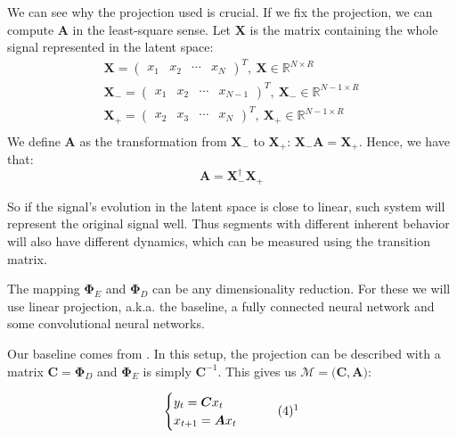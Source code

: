 \documentclass[twocolumn,10pt]{asme2ej}
\begin{document}
We can see why the projection used is crucial. If we fix the projection, we can compute $\bm A$ in the least-square sense. Let $\bm X$ is the matrix containing the whole signal represented in the latent space:
\begin{equation*}
    \label{eq:notation+-}
    \begin{gathered}
        \bm X = \begin{pmatrix}x_1 & x_2 & \cdots & x_{N}\end{pmatrix}^T,\ \bm X \in \mathbb{R}^{N \times R}\\
        \bm X_- = \begin{pmatrix}x_1 & x_2 & \cdots & x_{N-1}\end{pmatrix}^T,\ \bm X_- \in \mathbb{R}^{N-1 \times R}\\
        \bm X_+ = \begin{pmatrix}x_2 & x_3 & \cdots & x_{N}\end{pmatrix}^T,\ \bm X_+ \in \mathbb{R}^{N-1 \times R}\\
    \end{gathered}
\end{equation*}
We define $\bm A$ as the transformation from $\bm X_-$ to $\bm X_+$: $\bm X_- \bm A = \bm X_+$. Hence, we have that:
\begin{equation}
    \label{eq:A}
    \bm A = \bm X_-^\dagger \bm X_+
\end{equation}

So if the signal's evolution in the latent space is close to linear, such system will represent the original signal well. Thus segments with different inherent behavior will also have different dynamics, which can be measured using the transition matrix.

The mapping $\bm \Phi_E$ and $\bm \Phi_D$ can be any dimensionality reduction. For these we will use linear projection, a.k.a. the baseline, a fully connected neural network and some convolutional neural networks.

Our baseline comes from \cite{zappella}. In this setup, the projection can be described with a matrix $\bm C = \bm \Phi_D$ and $\bm \Phi_E$ is simply $\bm C^{-1}$. This gives us $\mathcal{M} = \big( \bm C, \bm A)$:

\begin{equation}\refstepcounter{equation}
    \begin{cases}
        y_t = \bm C x_t \\
        x_{t+1} = \bm A x_t
    \end{cases} \tag*{(4)\footnotemark}
\end{equation} 
\end{document}
